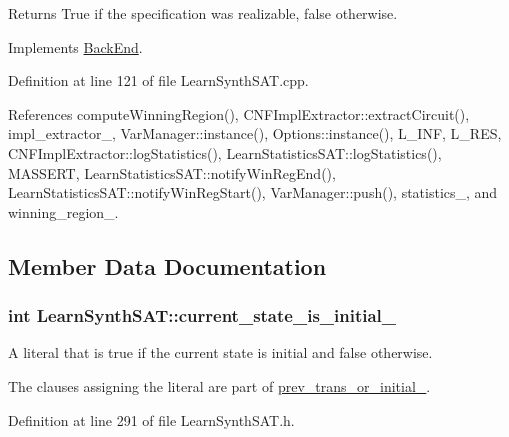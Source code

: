 \begin{DoxyReturn}{Returns}
True if the specification was realizable, false otherwise. 
\end{DoxyReturn}


Implements \hyperlink{classBackEnd_a099e717dc71e9cc2d838b1ca86340590}{Back\-End}.



Definition at line 121 of file Learn\-Synth\-S\-A\-T.\-cpp.



References compute\-Winning\-Region(), C\-N\-F\-Impl\-Extractor\-::extract\-Circuit(), impl\-\_\-extractor\-\_\-, Var\-Manager\-::instance(), Options\-::instance(), L\-\_\-\-I\-N\-F, L\-\_\-\-R\-E\-S, C\-N\-F\-Impl\-Extractor\-::log\-Statistics(), Learn\-Statistics\-S\-A\-T\-::log\-Statistics(), M\-A\-S\-S\-E\-R\-T, Learn\-Statistics\-S\-A\-T\-::notify\-Win\-Reg\-End(), Learn\-Statistics\-S\-A\-T\-::notify\-Win\-Reg\-Start(), Var\-Manager\-::push(), statistics\-\_\-, and winning\-\_\-region\-\_\-.



\subsection{Member Data Documentation}
\hypertarget{classLearnSynthSAT_ace0511849ad0020364743f54dd75afee}{
\subsubsection[{current\-\_\-state\-\_\-is\-\_\-initial\-\_\-}]{\setlength{\rightskip}{0pt plus 5cm}int Learn\-Synth\-S\-A\-T\-::current\-\_\-state\-\_\-is\-\_\-initial\-\_\-\hspace{0.3cm}{\ttfamily [protected]}}}\label{classLearnSynthSAT_ace0511849ad0020364743f54dd75afee}


A literal that is true if the current state is initial and false otherwise. 

The clauses assigning the literal are part of \hyperlink{classLearnSynthSAT_a6289a4f041ca85ce44a33143fab42888}{prev\-\_\-trans\-\_\-or\-\_\-initial\-\_\-}. 

Definition at line 291 of file Learn\-Synth\-S\-A\-T.\-h.



